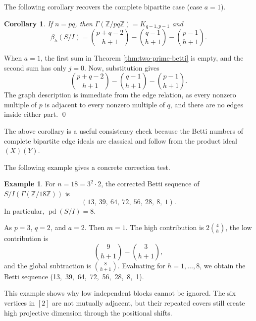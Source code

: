 \documentclass[12pt]{article}
\newtheorem{corollary}[theorem]{Corollary}
\theoremstyle{definition}
\newtheorem{example}[theorem]{Example}
\renewenvironment{proof}{{\bf \noindent Proof.}}{\qed}
\begin{document}
\medskip

\noindent The following corollary recovers the complete bipartite case (case $a=1$).
\begin{corollary}\label{cor:bipartite-case}
If $n=pq$, then $\Gamma(\mathbb{Z}/pq\mathbb{Z})=K_{q-1,p-1}$ and
$$
\beta_h(S/I)=\binom{p+q-2}{h+1}-\binom{q-1}{h+1}-\binom{p-1}{h+1}.
$$
\end{corollary}

\begin{proof}
When $a=1$, the first sum in Theorem \ref{thm:two-prime-betti} is empty, and the second sum has only $j=0$.  Now, substitution gives
$$
\binom{p+q-2}{h+1}-\binom{q-1}{h+1}-\binom{p-1}{h+1}.
$$
The graph description is immediate from the edge relation, as every nonzero multiple of $p$ is adjacent to every nonzero multiple of $q$, and there are no edges inside either part.
\end{proof}

\medskip

The above corollary is a useful consistency check because the Betti numbers of complete bipartite edge ideals are classical and follow from the product ideal $(X)(Y)$.

\medskip

\noindent The following example gives a concrete correction test.
\begin{example}\label{prop:z18-test}
For $n=18=3^2\cdot 2$, the corrected Betti sequence of $S/I(\Gamma(\mathbb{Z}/18\mathbb{Z}))$ is
$$
(13,\ 39,\ 64,\ 72,\ 56,\ 28,\ 8,\ 1).
$$
In particular, $\operatorname{pd}(S/I)=8$.
\end{example}

As $p=3$, $q=2$, and $a=2$.  Then $m=1$.  The high contribution is $2\binom{4}{h}$, the low contribution is
$$
\binom{9}{h+1}-\binom{3}{h+1},
$$
and the global subtraction is $\binom{8}{h+1}$.  Evaluating for $h=1,\ldots,8$, we obtain the Betti sequence (13,\ 39,\ 64,\ 72,\ 56,\ 28,\ 8,\ 1).

\medskip

This example shows why low independent blocks cannot be ignored.  The six vertices in $[2]$ are not mutually adjacent, but their repeated covers still create high projective dimension through the positional shifts.

\medskip
\end{document}
